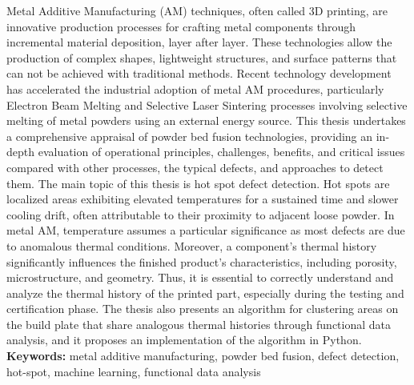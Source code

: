 Metal Additive Manufacturing (AM) techniques, often called 3D printing, are innovative production processes for crafting metal components through incremental material deposition, layer after layer. These technologies allow the production of complex shapes, lightweight structures, and surface patterns that can not be achieved with traditional methods. Recent technology development has accelerated the industrial adoption of metal AM procedures, particularly Electron Beam Melting and Selective Laser Sintering processes involving selective melting of metal powders using an external energy source. This thesis undertakes a comprehensive appraisal of powder bed fusion technologies, providing an in-depth evaluation of operational principles, challenges, benefits, and critical issues compared with other processes, the typical defects, and approaches to detect them. The main topic of this thesis is hot spot defect detection. Hot spots are localized areas exhibiting elevated temperatures for a sustained time and slower cooling drift, often attributable to their proximity to adjacent loose powder. In metal AM, temperature assumes a particular significance as most defects are due to anomalous thermal conditions. Moreover, a component's thermal history significantly influences the finished product's characteristics, including porosity, microstructure, and geometry. Thus, it is essential to correctly understand and analyze the thermal history of the printed part, especially during the testing and certification phase. The thesis also presents an algorithm for clustering areas on the build plate that share analogous thermal histories through functional data analysis, and it proposes an implementation of the algorithm in Python.
\\[0.5cm]
\textbf{Keywords:} metal additive manufacturing, powder bed fusion, defect detection, hot-spot, machine learning, functional data analysis

